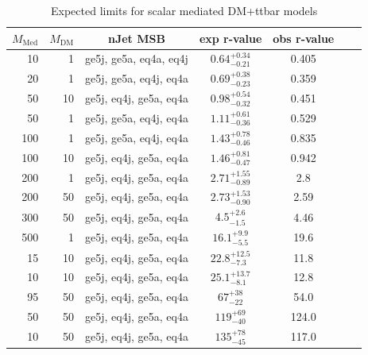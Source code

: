 
\begin{table}
  \centering
  \begin{tabular}{rrccccc}
    \hline\hline
    $M_{\text{Med}}$ & $M_{\text{DM}}$ & nJet MSB & exp r-value & obs r-value \\
    \hline
       10 &   1 & ge5j, ge5a, eq4a, eq4j & $0.64_{-0.21}^{+0.34}$ & 0.405 \\
       20 &   1 & ge5j, ge5a, eq4j, eq4a & $0.69_{-0.23}^{+0.38}$ & 0.359 \\
       50 &  10 & ge5j, eq4j, ge5a, eq4a & $0.98_{-0.32}^{+0.54}$ & 0.451 \\
       50 &   1 & ge5j, ge5a, eq4j, eq4a & $1.11_{-0.36}^{+0.61}$ & 0.529 \\
      100 &   1 & ge5j, ge5a, eq4j, eq4a & $1.43_{-0.46}^{+0.78}$ & 0.835 \\
      100 &  10 & ge5j, eq4j, ge5a, eq4a & $1.46_{-0.47}^{+0.81}$ & 0.942 \\
      200 &   1 & ge5j, eq4j, ge5a, eq4a & $2.71_{-0.89}^{+1.55}$ & 2.8 \\
      200 &  50 & ge5j, eq4j, ge5a, eq4a & $2.73_{-0.90}^{+1.53}$ & 2.59 \\
      300 &  50 & ge5j, eq4j, ge5a, eq4a & $4.5_{-1.5}^{+2.6}$    & 4.46 \\
      500 &   1 & ge5j, eq4j, ge5a, eq4a & $16.1_{-5.5}^{+9.9}$   & 19.6 \\
       15 &  10 & ge5j, eq4j, ge5a, eq4a & $22.8_{-7.3}^{+12.5}$  & 11.8 \\
       10 &  10 & ge5j, eq4j, ge5a, eq4a & $25.1_{-8.1}^{+13.7}$  & 12.8 \\
       95 &  50 & ge5j, eq4j, ge5a, eq4a & $67_{-22}^{+38}$       & 54.0 \\
       50 &  50 & ge5j, eq4j, ge5a, eq4a & $119_{-40}^{+69}$      & 124.0 \\
       10 &  50 & ge5j, eq4j, ge5a, eq4a & $135_{-45}^{+78}$      & 117.0 \\
    \hline\hline
  \end{tabular}
  \caption{Expected limits for scalar mediated DM+ttbar models}
  \label{tab:DMttS_exp}
\end{table}

